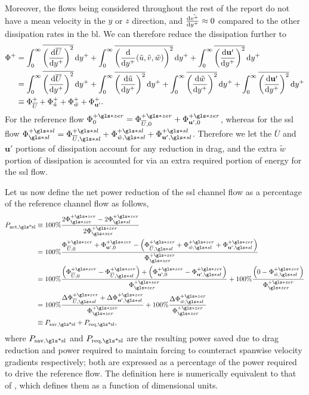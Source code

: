 Moreover, the flows being considered throughout the rest of the report do not have a mean velocity in the $y$ or $z$ direction, and $\dv{\tilde{v^{+}}}{y^{+}} \approx0$ compared to the other dissipation rates in the \gls*{bl}. We can therefore reduce the dissipation further to 
\begin{align}
	\Phi ^{+} &=\int_{0}^{\infty}  \overline{\left( \dv{\overline{U}}{y\ensuremath{^{+}}}  \right) ^2}\dd{y\ensuremath{^{+}}}+\int_{0}^{\infty}  \overline{\left( \dv{y\ensuremath{^{+}}}(\tilde{u},\tilde{v},\tilde{w})  \right) ^2} \dd{y\ensuremath{^{+}}} + \int_{0}^{\infty}  \overline{\left(\dv{\mathbf{u'} }{y\ensuremath{^{+}}}\right) ^2} \dd{y\ensuremath{^{+}}}\\
	&=\int_{0}^{\infty}  \overline{\left( \dv{\overline{U}}{y\ensuremath{^{+}}}  \right) ^2}\dd{y\ensuremath{^{+}}}+\int_{0}^{\infty}  \overline{\left( \dv{\tilde{u}}{y\ensuremath{^{+}}}  \right) ^2} \dd{y\ensuremath{^{+}}} +\int_{0}^{\infty}  \overline{\left( \dv{\tilde{w}}{y\ensuremath{^{+}}}  \right) ^2} \dd{y\ensuremath{^{+}}} + \int_{0}^{\infty}  \overline{\left(\dv{\mathbf{u'} }{y\ensuremath{^{+}}}\right) ^2} \dd{y\ensuremath{^{+}}}\\
	&\equiv \Phi_{\overline{U}}^{+} + \Phi _{\tilde{u}}^{+} + \Phi _{\tilde{w}}^{+} + \Phi _{\mathbf{u'} }^{+}
.\end{align}
For the reference flow $\Phi _{0}\pz=\Phi _{\overline{U},0}\pz+\Phi _{\mathbf{u'} ,0}\pz$, whereas for the \gls*{ssl} flow $\Phi \ssl\ps=\Phi _{\overline{U},\gls*{sl}}\ps + \Phi _{\tilde{w},\gls*{sl}}\ps + \Phi _{\mathbf{u'},\gls*{sl} }\ps$. Therefore we let the $\overline{U}$ and $\mathbf{u'} $ portions of dissipation account for any reduction in drag, and the extra $\tilde{w}$ portion of dissipation is accounted for via an extra required portion of energy for the \gls*{ssl} flow.

Let us now define the net power reduction of the \gls*{ssl} channel flow as a percentage of the reference channel flow as follows,
\begin{align}
	P_\text{net,\gls*{sl}} &\equiv 100\% \frac{ 2\Phi \zz\pz-2\Phi \ssl\pz }{2\Phi \zz\pz} \\
			       &= 100\% \frac{\Phi _{\overline{U},0}\pz+\Phi _{\mathbf{u'} ,0}\pz-\left(\Phi _{\overline{U},\gls*{sl}}\pz + \Phi _{\tilde{w},\gls*{sl}}\pz + \Phi _{\mathbf{u'},\gls*{sl} }\pz\right)}{\Phi \zz\pz} \\
			       &= 100\% \frac{\left(\Phi _{\overline{U},0}\pz-\Phi _{\overline{U},\gls*{sl}}\pz\right)+\left(\Phi _{\mathbf{u'} ,0}\pz - \Phi _{\mathbf{u'},\gls*{sl} }\pz\right)}{\Phi \zz\pz}+100\%\frac{\left(0- \Phi _{\tilde{w},\gls*{sl}}\pz\right) }{\Phi \zz\pz} \\
			       &= 100\% \frac{\Delta\Phi _{\overline{U},\gls*{sl}}\pz+\Delta \Phi _{\mathbf{u'},\gls*{sl} }\pz}{\Phi \zz\pz}+100\%\frac{ \Delta\Phi _{\tilde{w},\gls*{sl}}\pz }{\Phi \zz\pz} \\
			       &\equiv P_\text{sav,\gls*{sl}} +  P_\text{req,\gls*{sl}} \label{eq:psavpreqsl}
,\end{align}
where $P_\text{sav,\gls*{sl}} $ and $P_\text{req,\gls*{sl}} $ are the resulting power saved due to drag reduction and power required to maintain forcing to counteract spanwise velocity gradients respectively; both are expressed as a percentage of the power required to drive the reference flow. The definition here is numerically equivalent to that of \textcite{viotti2009}, which defines them as a function of dimensional units.

